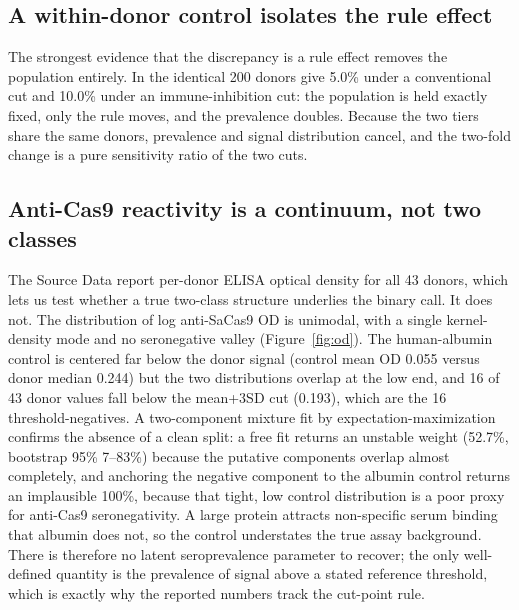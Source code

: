 \documentclass[11pt]{article}
\begin{document}
\subsection{A within-donor control isolates the rule effect}
The strongest evidence that the discrepancy is a rule effect removes the population entirely. In \citet{simhadri2018} the identical 200 donors give 5.0\% under a conventional cut and 10.0\% under an immune-inhibition cut: the population is held exactly fixed, only the rule moves, and the prevalence doubles. Because the two tiers share the same donors, prevalence and signal distribution cancel, and the two-fold change is a pure sensitivity ratio of the two cuts.

\subsection{Anti-Cas9 reactivity is a continuum, not two classes}
The \citet{simhadri2026} Source Data report per-donor ELISA optical density for all 43 donors, which lets us test whether a true two-class structure underlies the binary call. It does not. The distribution of log anti-SaCas9 OD is unimodal, with a single kernel-density mode and no seronegative valley (Figure~\ref{fig:od}). The human-albumin control is centered far below the donor signal (control mean OD 0.055 versus donor median 0.244) but the two distributions overlap at the low end, and 16 of 43 donor values fall below the mean+3SD cut (0.193), which are the 16 threshold-negatives. A two-component mixture fit by expectation-maximization confirms the absence of a clean split: a free fit returns an unstable weight (52.7\%, bootstrap 95\% 7--83\%) because the putative components overlap almost completely, and anchoring the negative component to the albumin control returns an implausible 100\%, because that tight, low control distribution is a poor proxy for anti-Cas9 seronegativity. A large protein attracts non-specific serum binding that albumin does not, so the control understates the true assay background. There is therefore no latent seroprevalence parameter to recover; the only well-defined quantity is the prevalence of signal above a stated reference threshold, which is exactly why the reported numbers track the cut-point rule.
\end{document}
